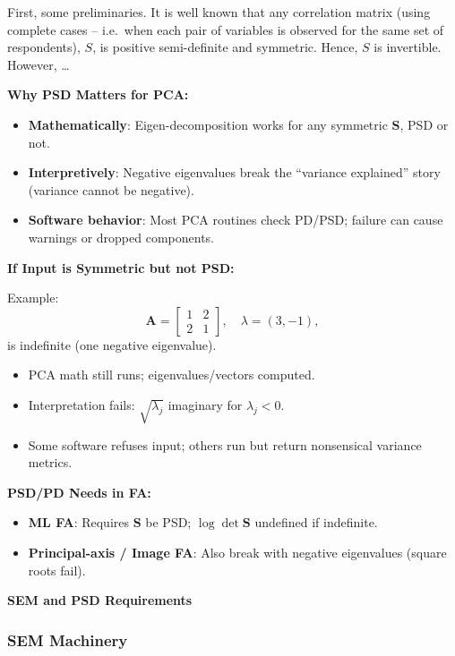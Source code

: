 \documentclass[
  12pt,
]{article}
\providecommand{\tightlist}{%
  \setlength{\itemsep}{0pt}\setlength{\parskip}{0pt}}
\theoremstyle{plain}
\theoremstyle{definition}
\theoremstyle{remark}
\begin{document}
First, some preliminaries. It is well known that any correlation matrix
(using complete cases -- i.e.~when each pair of variables is observed
for the same set of respondents), \(S\), is positive semi-definite and
symmetric. Hence, \(S\) is invertible. However, \ldots{}

\textbf{Why PSD Matters for PCA:}

\begin{itemize}
\tightlist
\item
  \textbf{Mathematically}: Eigen-decomposition works for any symmetric
  \(\mathbf{S}\), PSD or not.
\item
  \textbf{Interpretively}: Negative eigenvalues break the ``variance
  explained'' story (variance cannot be negative).
\item
  \textbf{Software behavior}: Most PCA routines check PD/PSD; failure
  can cause warnings or dropped components.
\end{itemize}

\textbf{If Input is Symmetric but not PSD:}

Example: \[
\mathbf{A} = \begin{bmatrix} 1 & 2 \\ 2 & 1 \end{bmatrix},\quad \lambda = (3,-1),
\] is indefinite (one negative eigenvalue).

\begin{itemize}
\tightlist
\item
  PCA math still runs; eigenvalues/vectors computed.
\item
  Interpretation fails: \(\sqrt{\lambda_j}\) imaginary for
  \(\lambda_j<0\).
\item
  Some software refuses input; others run but return nonsensical
  variance metrics.
\end{itemize}

\textbf{PSD/PD Needs in FA:}

\begin{itemize}
\tightlist
\item
  \textbf{ML FA}: Requires \(\mathbf{S}\) be PSD;
  \(\log \det \mathbf{S}\) undefined if indefinite.
\item
  \textbf{Principal-axis / Image FA}: Also break with negative
  eigenvalues (square roots fail).
\end{itemize}

\textbf{SEM and PSD Requirements}

\subsubsection{SEM Machinery}\label{sem-machinery}
\end{document}
